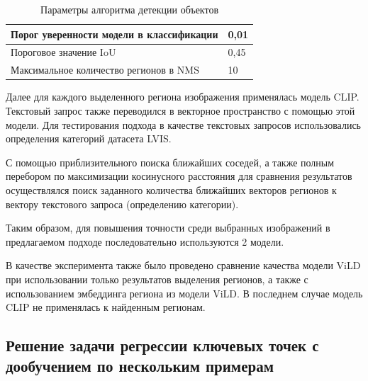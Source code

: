 \documentclass[a4paper,14pt]{article}
\begin{document}
    \begin{center}
	\begin{table}[H]
		\centering
		\caption{Параметры алгоритма детекции объектов}
		\label{tab:base_params}
		\bgroup
		\def\arraystretch{1.5}
    	\begin{tabular}{| l | l |}
			\hline
			Порог уверенности модели в классификации & 0,01\\ \hline
			Пороговое значение IoU & 0,45 \\ \hline
			Максимальное количество регионов в NMS  & 10\\
			\hline
		\end{tabular}
			\egroup
		\end{table}
	\end{center}

	Далее для каждого выделенного региона изображения применялась модель CLIP. 
	Текстовый запрос также переводился в векторное пространство с помощью этой модели. 
	Для тестирования подхода в качестве текстовых запросов использовались определения категорий датасета LVIS.
	
	С помощью приблизительного поиска ближайших соседей, а также полным перебором по максимизации косинусного расстояния для сравнения результатов осуществлялся поиск заданного количества ближайших векторов регионов к вектору текстового запроса (определению категории).
	
    
    Таким образом, для повышения точности среди выбранных изображений в предлагаемом подходе последовательно используются 2 модели.
    
    В качестве эксперимента также было проведено сравнение качества модели ViLD при использовании только результатов выделения регионов, а также с использованием эмбеддинга региона из модели ViLD. 
    В последнем случае модель CLIP не применялась к найденным регионам.
    
    \subsection{Решение задачи регрессии ключевых точек с дообучением по нескольким примерам}
    
\end{document}

